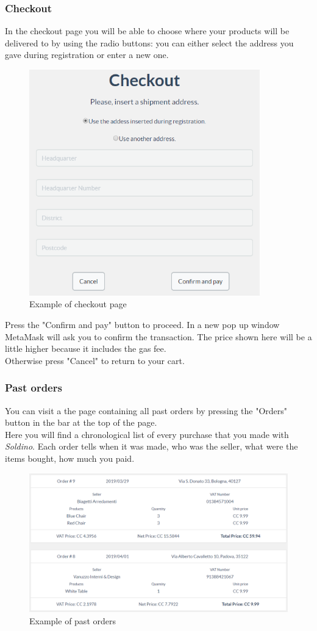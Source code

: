 	\subsubsection{Checkout}
	In the checkout page you will be able to choose where your products will be 
	delivered to by using the radio buttons: you can either select the address you 
	gave during registration or enter a new one.\\
	\begin{figure}[H]
		\includegraphics[width=10cm]{res/images/checkout.png}
		\centering
		\caption{Example of checkout page}
	\end{figure}
	\noindent Press the "Confirm and pay" button to proceed. In a new 
	pop up window MetaMask will ask you to confirm the transaction. The price 
	shown here will be a little higher because it includes the gas fee. \\
	Otherwise press "Cancel" to return to your cart.
	\subsubsection{Past orders}
	You can visit a the page containing all past orders by pressing the "Orders" 
	button in the bar at the top of the page.\\
	Here you will find a chronological list of every purchase that you made with 
	\textit{Soldino}. Each order tells when it was made, who was the seller, 
	what were the items bought, how much you paid.
	\begin{figure}[H]
		\includegraphics[width=15cm]{res/images/past_orders.png}
		\centering
		\caption{Example of past orders}
	\end{figure}
	\noindent